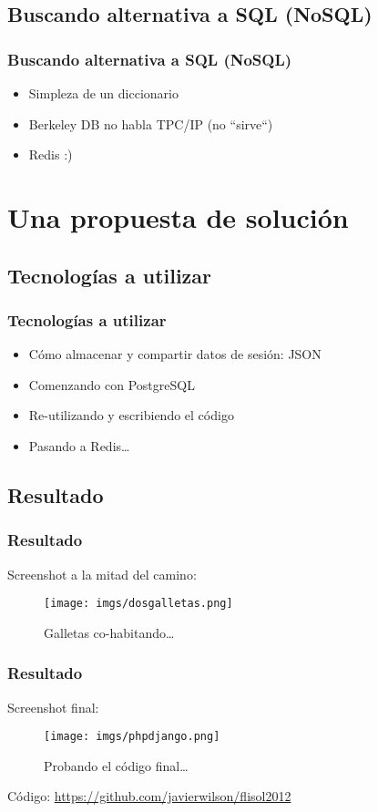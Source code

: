 \documentclass{beamer}
\begin{document}
\subsection{Buscando alternativa a SQL (NoSQL)} 
\begin{frame}\frametitle{Buscando alternativa a SQL (NoSQL)}
\begin{itemize}
\item Simpleza de un diccionario \pause
\item Berkeley DB no habla TPC/IP (no ``sirve``) \pause
\item Redis :)
\end{itemize} 
\end{frame}

\section{Una propuesta de solución}
\subsection{Tecnologías a utilizar}
\begin{frame}\frametitle{Tecnologías a utilizar}
\begin{itemize}
\item Cómo almacenar y compartir datos de sesión: JSON \pause
\item Comenzando con PostgreSQL \pause
\item Re-utilizando y escribiendo el código \pause
\item Pasando a Redis\ldots
\end{itemize} 
\end{frame}

\subsection{Resultado}
\begin{frame}\frametitle{Resultado}
Screenshot a la mitad del camino:
\begin{figure}
\texttt{[image: imgs/dosgalletas.png]}
\caption{Galletas co-habitando\ldots}
\end{figure}
\end{frame}

\begin{frame}\frametitle{Resultado}
Screenshot final: 
\begin{figure}
\texttt{[image: imgs/phpdjango.png]}
\caption{Probando el código final\ldots}
\end{figure}

Código: \url{https://github.com/javierwilson/flisol2012}
\end{frame}
\end{document}
